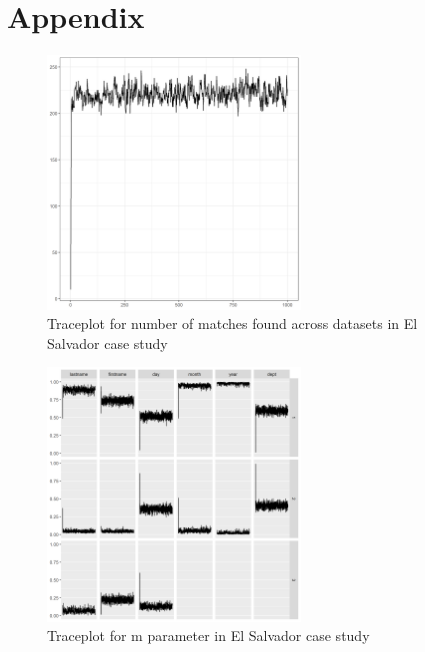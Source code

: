 \documentclass[12pt,letterpaper]{article}
\newcommand{\1}[1]{\mathbb{I}\!\left[#1\right]} %
\begin{document}
\bigskip

\section{Appendix}
\label{sec:appendix}

\begin{figure}[h!]
	
	{\centering \includegraphics[width=0.6\textwidth]{../notes/figures/el_salvador/overlap_trace} 
		
	}
	
	\caption{Traceplot for number of matches found across datasets in El Salvador case study}\label{fig:overlap_trace}
\end{figure}

\begin{figure}[h!]
	
	{\centering \includegraphics[width=0.6\textwidth]{../notes/figures/el_salvador/m_trace} 
		
	}
	
	\caption{Traceplot for m parameter in El Salvador case study}\label{fig:m_trace}
\end{figure}
\end{document}

